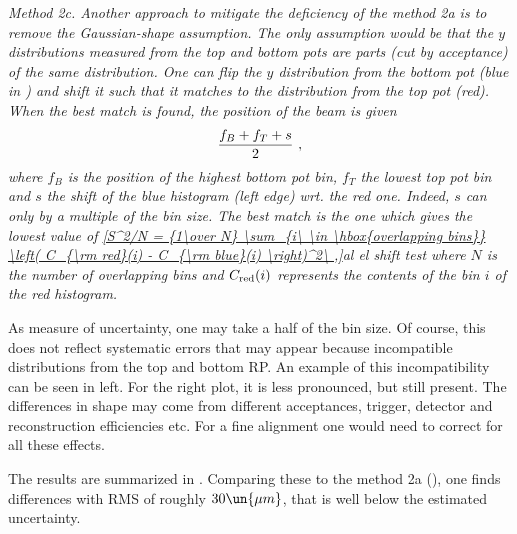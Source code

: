 

\em{Method 2c}. Another approach to mitigate the deficiency of the method 2a is to remove the Gaussian-shape assumption. The only assumption would be that the $y$ distributions measured from the top and bottom pots are parts (cut by acceptance) of the same distribution. One can flip the $y$ distribution from the bottom pot (blue in ) and shift it such that it matches to the distribution from the top pot (red). When the best match is found, the position of the beam is given
$${f_B + f_T + s\over 2}\ ,$$
where $f_B$ is the position of the highest bottom pot bin, $f_T$ the lowest top pot bin and $s$ the shift of the blue histogram (left edge) wrt. the red one. Indeed, $s$ can only by a multiple of the bin size. The best match is the one which gives the lowest value of
\eqref{S^2/N = {1\over N} \sum_{i\ \in \hbox{overlapping bins}} \left( C_{\rm red}(i) - C_{\rm blue}(i) \right)^2\ ,}{al el shift test}
where $N$ is the number of overlapping bins and $C_{\rm red}(i)$ represents the contents of the bin $i$ of the red histogram.

As measure of uncertainty, one may take a half of the bin size. Of course, this does not reflect systematic errors that may appear because incompatible distributions from the top and bottom RP. An example of this incompatibility can be seen in  left. For the right plot, it is less pronounced, but still present. The differences in shape may come from different acceptances, trigger, detector and reconstruction efficiencies etc. For a fine alignment one would need to correct for all these effects.

The results are summarized in . Comparing these to the method 2a (), one finds differences with RMS of roughly $30\un{\mu m}$, that is well below the estimated uncertainty.



